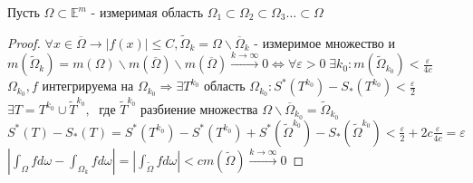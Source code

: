 \begin{theorem}
	Пусть $\Omega\subset \mathbb{E}^m$ - измеримая область $\Omega_1 \subset  \Omega_2 \subset  \Omega_3 \dots \subset \Omega$ 
\end{theorem}
\begin{proof}
	$\forall x\in \overline{\Omega} \rightarrow |f(x)|\leq C, \widetilde{\Omega}_k=\Omega\backslash \overline{\Omega}_k  $ - измеримое множество и $m(\widetilde{\Omega}_k)=m(\Omega)\backslash m(\overline{\Omega})\backslash m(\overline{\Omega})\xrightarrow{k\rightarrow \infty} 0  \Leftrightarrow  \forall \varepsilon>0 \; \exists k_0: m(\widetilde{\Omega}_{k_0})< \frac{\varepsilon}{4c}$ \\
	$\Omega_{k_0}, f $ интегрируема на $\Omega_{k_0} \Rightarrow \exists T^{k_0} $ область $\Omega_{k_0}: S^*(T^{k_0}) - S_*(T^{k_0})< \frac \varepsilon 2 $\\
	$\exists T=T^{k_0} \cup \widetilde{T}^{k_0}, \;$ где $\widetilde{T}^{k_0} $ разбиение множества $\Omega\backslash \overline{\Omega}_{k_0} = \widetilde{\Omega}_{k_0} $\\
	$S^*(T)-S_*(T)= S^*(T^{k_0}) -  S^*(T^{k_0}) + S^*(\widetilde{\Omega}^{k_0})- S_*(\widetilde{\Omega}^{k_0})< \frac \varepsilon 2 + 2c\frac{\varepsilon}{4c}= \varepsilon $\\
	$|\int_\Omega fd\omega - \int_{\Omega_k} fd\omega| = |\int_{\widetilde{\Omega}}fd\omega|<cm(\widetilde{\Omega})\xrightarrow{k\rightarrow \infty} 0 $
\end{proof}


